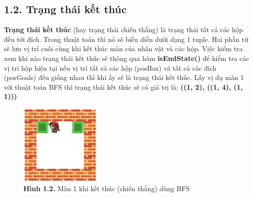\documentclass[a4paper,12pt]{article}
\begin{document}
\subsection*{1.2. Trạng thái kết thúc}
\hspace*{7mm}\textbf{Trạng thái kết thúc} (hay trạng thái chiến thắng) là trạng thái tất cả các hộp đều tới đích. Trong thuật toán thì nó sẽ biểu diễn dưới dạng 1 tuple. Hai phần tử sẽ lưu vị trí cuối cùng khi kết thúc màn của nhân vật và các hộp. Việc kiểm tra xem khi nào trạng thái kết thúc sẽ thông qua hàm \textbf{isEndState()} để kiểm tra các vị trí hộp hiện tại nếu vị trí tất cả các hộp (posBox) và tất cả các đích (posGoals) đều giống nhau thì khi ấy sẽ là trạng thái kết thúc. Lấy vị dụ màn 1 với thuật toán BFS thì trạng thái kết thúc sẽ có giá trị là: \textbf{((1, 2), ((1, 4), (1, 1)))}
\begin{figure}[h]
\centering
\includegraphics[width=4cm]{Level_1_end.png}
\caption*{\textbf{Hình 1.2.} Màn 1 khi kết thúc (chiến thắng) dùng BFS}
\end{figure}
\newpage
\end{document}
